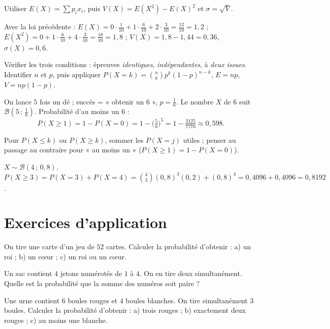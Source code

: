 Utiliser $E(X)=\sum p_i x_i$, puis $V(X)=E(X^2)-E(X)^2$ et $\sigma=\sqrt{V}$.
\begin{exemple}
Avec la loi précédente :
$E(X)=0\cdot\frac1{10}+1\cdot\frac6{10}+2\cdot\frac3{10}=\frac{12}{10}=1{,}2$ ;
$E(X^2)=0+1\cdot\frac6{10}+4\cdot\frac3{10}=\frac{18}{10}=1{,}8$ ;
$V(X)=1{,}8-1{,}44=0{,}36$, $\sigma(X)=0{,}6$.
\end{exemple}

Vérifier les trois conditions : épreuves \emph{identiques}, \emph{indépendantes},
à \emph{deux issues}. Identifier $n$ et $p$, puis appliquer
$P(X{=}k)=\binom nk p^k(1-p)^{n-k}$, $E=np$, $V=np(1-p)$.
\begin{exemple}
On lance $5$ fois un dé ; succès = « obtenir un $6$ », $p=\frac16$. Le nombre $X$
de $6$ suit $\mathcal B(5\,;\,\frac16)$. Probabilité d'au moins un $6$ :
\[
P(X\ge1)=1-P(X{=}0)=1-\Big(\tfrac56\Big)^5=1-\tfrac{3125}{7776}\approx0{,}598.
\]
\end{exemple}

Pour $P(X\le k)$ ou $P(X\ge k)$, sommer les $P(X{=}j)$ utiles ; penser au passage
au contraire pour « au moins un » ($P(X\ge1)=1-P(X{=}0)$).
\begin{exemple}
$X\sim\mathcal B(4\,;\,0{,}8)$. $P(X\ge3)=P(X{=}3)+P(X{=}4)
=\binom43(0{,}8)^3(0{,}2)+(0{,}8)^4=0{,}4096+0{,}4096=0{,}8192$.
\end{exemple}

\section{Exercices d'application}

\exo{} On tire une carte d'un jeu de $52$ cartes. Calculer la probabilité
d'obtenir : a) un roi ; b) un c\oe ur ; c) un roi ou un c\oe ur.

\exo{} Un sac contient $4$ jetons numérotés de $1$ à $4$. On en tire deux
simultanément. Quelle est la probabilité que la somme des numéros soit paire ?

\exo{} Une urne contient $6$ boules rouges et $4$ boules blanches. On tire
simultanément $3$ boules. Calculer la probabilité d'obtenir : a) trois rouges ;
b) exactement deux rouges ; c) au moins une blanche.

